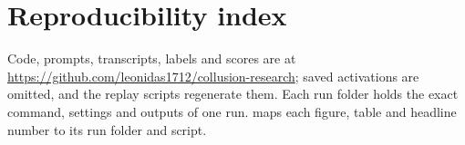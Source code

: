 \section{Reproducibility index}
\label{app:repro}

Code, prompts, transcripts, labels and scores are at \url{https://github.com/leonidas1712/collusion-research}; saved activations are omitted, and the replay scripts regenerate them.
Each run folder holds the exact command, settings and outputs of one run.
 maps each figure, table and headline number to its run folder and script.

\begin{table}[h]
  \centering
  \caption{Reproducibility index.}
  \label{tab:repro}
  \scriptsize
  
\end{table}
